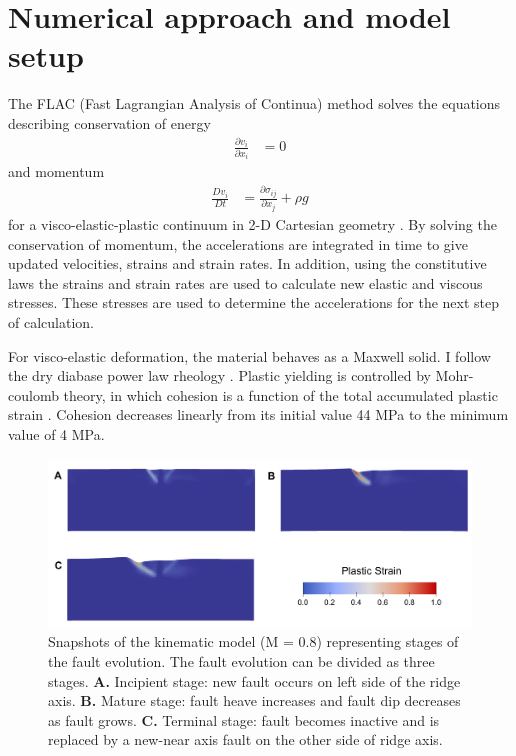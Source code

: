 \documentclass[letterpaper,12pt,notitle]{memphisthesis}                     %
\begin{document}
\section{Numerical approach and model setup}
The FLAC (Fast Lagrangian Analysis of Continua) method \citep{Cundall1982, Poliakov1993} solves the equations describing conservation of energy
\begin{align}
\frac{\partial v_i}{\partial x_i} & = 0
\end{align}
\noindent and momentum
\begin{align}
 \frac{D v_i}{D t} & = \frac{\partial \sigma_{ij}}{\partial x_{j}} + \rho g
\end{align}
\noindent for a visco-elastic-plastic continuum in 2-D Cartesian geometry \citep{Lavier2002}. By solving the conservation of momentum, the accelerations are integrated in time to give updated velocities, strains and strain rates. In addition, using the constitutive laws the strains and strain rates are used to calculate new elastic and viscous stresses. These stresses are used to determine the accelerations for the next step of calculation.

For visco-elastic deformation, the material behaves as a Maxwell solid. I follow the dry diabase power law rheology \citep{Kirby1987, Chen1990}. Plastic yielding is controlled by Mohr-coulomb theory, in which cohesion is a function of the total accumulated plastic strain \citep{Poliakov1998}. Cohesion decreases linearly from its initial value 44 MPa to the minimum value of 4 MPa.

\begin{figure}[!htb]
	\centering
	\includegraphics[width=0.9\linewidth]{./figs/fault_stage.pdf}
	\caption{ Snapshots of the kinematic model (M = 0.8) representing stages of the fault evolution. The fault evolution can be divided as three stages. \textbf{A.} Incipient stage: new fault occurs on left side of the ridge axis.  \textbf{B.} Mature stage: fault heave increases and fault dip decreases as fault grows. \textbf{C.} Terminal stage: fault becomes inactive and is replaced by a new-near axis fault on the other side of ridge axis.}
	\label{fig:faultstage}
\end{figure}
\end{document}
